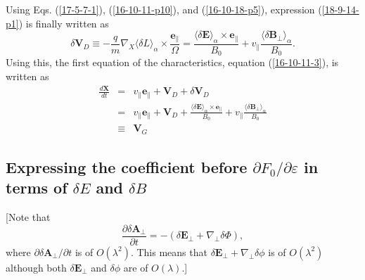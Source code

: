 \documentclass{article}
\newcommand{\tmem}[1]{{\em #1\/}}
\begin{document}
Using Eqs. (\ref{17-5-7-1}), (\ref{16-10-11-p10}), and (\ref{16-10-18-p5}),
expression (\ref{18-9-14-p1}) is finally written as
\begin{equation}
  \label{21-8-5-p1} \delta \mathbf{V}_D \equiv - \frac{q}{m} \nabla_X \langle
  \delta L \rangle_{\alpha} \times \frac{\mathbf{e}_{\parallel}}{\Omega} =
  \frac{\langle \delta \mathbf{E} \rangle_{\alpha} \times
  \mathbf{e}_{\parallel}}{B_0} + v_{\parallel} \frac{\langle \delta
  \mathbf{B}_{\perp} \rangle_{\alpha}}{B_0} .
\end{equation}
Using this, the first equation of the characteristics, equation
(\ref{16-10-11-3}), is written as
\begin{eqnarray}
  \frac{d\mathbf{X}}{d t} & = & v_{\parallel} \mathbf{e}_{\parallel}
  +\mathbf{V}_D + \delta \mathbf{V}_D  \label{16-10-11-p20}\\
  & = & v_{\parallel} \mathbf{e}_{\parallel} +\mathbf{V}_D + \frac{\langle
  \delta \mathbf{E} \rangle_{\alpha} \times \mathbf{e}_{\parallel}}{B_0} +
  v_{\parallel} \frac{\langle \delta \mathbf{B}_{\perp} \rangle_{\alpha}}{B_0}
  \nonumber\\
  & \equiv & \mathbf{V}_G 
\end{eqnarray}

\subsection{Expressing {\tmem{}}the coefficient before $\partial F_0 /
\partial \varepsilon$ in terms of $\delta E$ and $\delta B$}

[Note that
\begin{equation}
  \frac{\partial \delta \mathbf{A}_{\perp}}{\partial t} = - (\delta
  \mathbf{E}_{\perp} + \nabla_{\perp} \delta \Phi),
\end{equation}
where $\partial \delta \mathbf{A}_{\perp} / \partial t$ is of $O (\lambda^2)$.
This means that $\delta \mathbf{E}_{\perp} + \nabla_{\perp} \delta \phi$ is of
$O (\lambda^2)$ although both $\delta \mathbf{E}_{\perp}$ and $\delta \phi$
are of $O (\lambda)$.]
\end{document}
